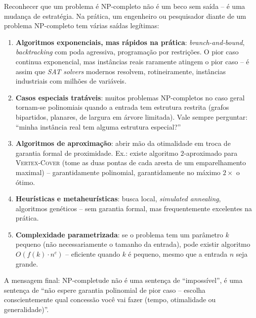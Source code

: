 \documentclass[9pt,a4paper]{extarticle}
\newcommand{\impt}[1]{\textcolor{important}{\textbf{#1}}}
\newcommand{\ntc}[1]{\textcolor{notice}{#1}}
\theoremstyle{definition}
\begin{document}
Reconhecer que um problema é NP-completo não é um beco sem saída -- é uma mudança de estratégia. Na prática, um engenheiro ou pesquisador diante de um problema NP-completo tem várias saídas legítimas:

\begin{enumerate}
\item \impt{Algoritmos exponenciais, mas rápidos na prática}: \emph{branch-and-bound}, \emph{backtracking} com poda agressiva, programação por restrições. O pior caso continua exponencial, mas instâncias reais raramente atingem o pior caso -- é assim que \emph{SAT solvers} modernos resolvem, rotineiramente, instâncias industriais com milhões de variáveis.
\item \impt{Casos especiais tratáveis}: muitos problemas NP-completos no caso geral tornam-se polinomiais quando a entrada tem estrutura restrita (grafos bipartidos, planares, de largura em árvore limitada). Vale sempre perguntar: \enquote{minha instância real tem alguma estrutura especial?}
\item \impt{Algoritmos de aproximação}: abrir mão da otimalidade em troca de garantia formal de proximidade. Ex.: existe algoritmo \(2\)-aproximado para \textsc{Vertex-Cover} (tome as duas pontas de cada aresta de um emparelhamento maximal) -- garantidamente polinomial, garantidamente no máximo \(2\times\) o ótimo.
\item \impt{Heurísticas e metaheurísticas}: busca local, \emph{simulated annealing}, algoritmos genéticos -- sem garantia formal, mas frequentemente excelentes na prática.
\item \impt{Complexidade parametrizada}: se o problema tem um parâmetro \(k\) pequeno (não necessariamente o tamanho da entrada), pode existir algoritmo \(O(f(k)\cdot n^c)\) -- eficiente quando \(k\) é pequeno, mesmo que a entrada \(n\) seja grande.
\end{enumerate}

\ntc{A mensagem final: NP-completude não é uma sentença de \enquote{impossível}, é uma sentença de \enquote{não espere garantia polinomial de pior caso -- escolha conscientemente qual concessão você vai fazer (tempo, otimalidade ou generalidade)}.}



\end{document}

